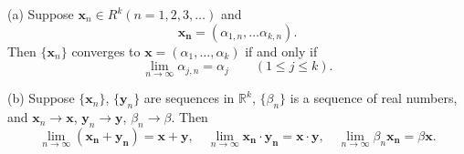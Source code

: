 \begin{thm}\label{thm:3.4}
    (a) Suppose $\mathbf{x}_n \in R^k (n = 1,2,3,\dots)$ and
    \begin{equation*}
        \mathbf{x_n} = (
            \alpha_{1,n},\dots
            \alpha_{k,n}
        ).
    \end{equation*}
    Then $\{\mathbf{x}_n\}$ converges to $\mathbf{x} = (\alpha_1, \dots, \alpha_k)$ if and only if
    \begin{equation}
        \lim_{n \to \infty} \alpha_{j,n} = \alpha_j \qquad (1\leq j\leq k).
    \end{equation}

    (b) Suppose $\{\mathbf{x}_n\}$, $\{\mathbf{y}_n\}$ are sequences in $\mathbb{R}^k$, $\{\beta_n\}$ is a sequence of real numbers, and 
    $\mathbf{x}_n \rightarrow \mathbf{x}$,
    $\mathbf{y}_n \rightarrow \mathbf{y}$,
    $\beta_n \rightarrow \beta$. Then
    \begin{equation*}
        \lim_{n \to \infty} (\mathbf{x_n} + \mathbf{y_n}) = \mathbf{x} + \mathbf{y}, \quad
        \lim_{n \to \infty} \mathbf{x_n} \cdot \mathbf{y_n} = \mathbf{x} \cdot \mathbf{y}, \quad
        \lim_{n \to \infty} \beta_n \mathbf{x_n} = \beta \mathbf{x}.
    \end{equation*}
\end{thm}
